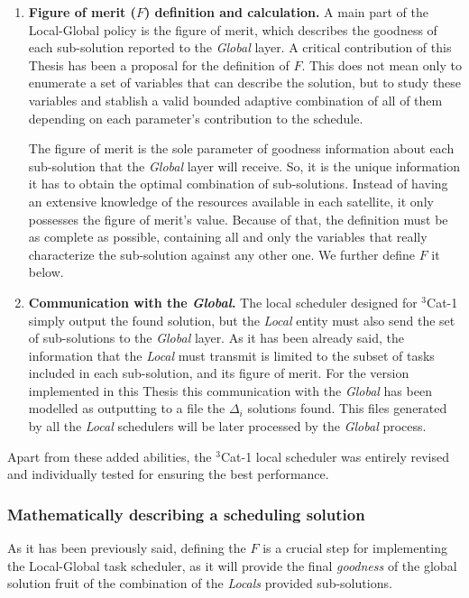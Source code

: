 \begin{enumerate}
\item \textbf{Figure of merit ($F$) definition and calculation. } A main part of the Local-Global policy is the figure of merit, which describes the goodness of each sub-solution reported to the \emph{Global} layer. A critical contribution of this Thesis has been a proposal for the definition of $F$. This does not mean only to enumerate a set of variables that can describe the solution, but to study these variables and stablish a valid bounded adaptive combination of all of them depending on each parameter's contribution to the schedule. 

The figure of merit is the sole parameter of goodness information about each sub-solution that the \emph{Global} layer will receive. So, it is the unique information it has to obtain the optimal combination of sub-solutions. Instead of having an extensive knowledge of the resources available in each satellite, it only possesses the figure of merit's value. Because of that, the definition must be as complete as possible, containing all and only the variables that really characterize the sub-solution against any other one. We further define $F$ it below.

\item \textbf{Communication with the \emph{Global}. } The local scheduler designed for $^3$Cat-1 simply output the found solution, but the \emph{Local} entity must also send the set of sub-solutions to the \emph{Global} layer. As it has been already said, the information that the \emph{Local} must transmit is limited to the subset of tasks included in each sub-solution, and its figure of merit. For the version implemented in this Thesis this communication with the \emph{Global} has been modelled as outputting to a file the $\Delta_i$ solutions found. This files generated by all the \emph{Local} schedulers will be later processed by the \emph{Global} process.

\end{enumerate}

Apart from these added abilities, the $^3$Cat-1 local scheduler was entirely revised and individually tested for ensuring the best performance.

\subsubsection{Mathematically describing a scheduling solution}

As it has been previously said, defining the $F$ is a crucial step for implementing the Local-Global task scheduler, as it will provide the final \emph{goodness} of the global solution fruit of the combination of the \emph{Locals} provided sub-solutions.

